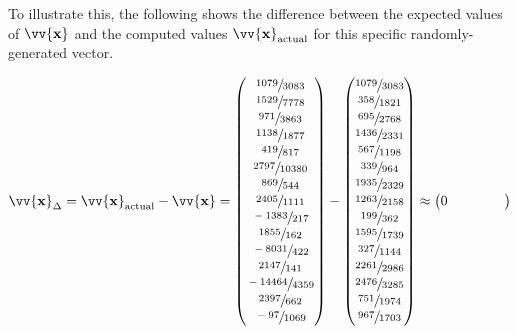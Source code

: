 \documentclass[12pt]{article}
\newcommand{\vect}[1]{\vv{\mathbf{#1}}}
\begin{document}
To illustrate this, the following shows the difference between the expected values of \(\vect{x}\) and the computed values \(\vect{x}_{\text{actual}}\) for this specific randomly-generated vector.

$$
\vect{x}_{\Delta} = \vect{x}_{\text{actual}}-\vect{x}
= \begin{pmatrix*}
    \sfrac{1079}{3083} \\  
    \sfrac{1529}{7778} \\  
    \sfrac{971}{3863} \\  
    \sfrac{1138}{1877} \\  
    \sfrac{419}{817} \\   
    \sfrac{2797}{10380} \\ 
    \sfrac{869}{544} \\   
    \sfrac{2405}{1111} \\  
    \sfrac{-1383}{217} \\   
    \sfrac{1855}{162} \\   
    \sfrac{-8031}{422} \\   
    \sfrac{2147}{141} \\   
    \sfrac{-14464}{4359} \\  
    \sfrac{2397}{662} \\   
    \sfrac{-97}{1069}  
\end{pmatrix*}
- \begin{pmatrix*}
    \sfrac{1079}{3083} \\  
    \sfrac{358}{1821} \\  
    \sfrac{695}{2768} \\  
    \sfrac{1436}{2331} \\  
    \sfrac{567}{1198} \\  
    \sfrac{339}{964} \\   
    \sfrac{1935}{2329} \\  
    \sfrac{1263}{2158} \\  
    \sfrac{199}{362} \\   
    \sfrac{1595}{1739} \\  
    \sfrac{327}{1144} \\  
    \sfrac{2261}{2986} \\  
    \sfrac{2476}{3285} \\  
    \sfrac{751}{1974} \\  
    \sfrac{967}{1703}
\end{pmatrix*}
\approx
\begin{pmatrix*}[r]
    0\phantom{.00000\ldots} \\

\end{pmatrix*}$$
\end{document}

